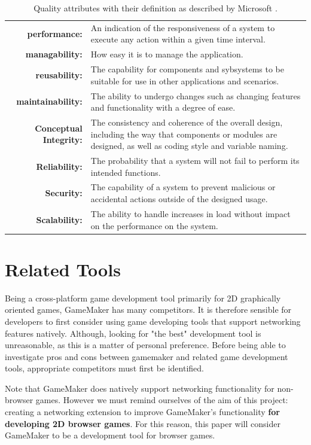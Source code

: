 \documentclass[bsc,frontabs,twoside,singlespacing,parskip,deptreport]{infthesis}     %
\begin{document}
\begin{table}[H]
\centering
  \begin{tabularx}{\textwidth}{r X}
	\textbf{performance:} & An indication of the responsiveness of a system to execute any action within a given time interval.\\
	\textbf{managability:} & How easy it is to manage the application.\\
	\textbf{reusability:} & The capability for components and sybsystems to be suitable for use in other applications and scenarios.\\
	\textbf{maintainability:} & The ability to undergo changes such as changing features and functionality with a degree of ease.\\
	\textbf{Conceptual Integrity:} & The consistency and coherence of the overall design, including the way that components or modules are designed, as well as coding style and variable naming.\\
	\textbf{Reliability:} & The probability that a system will not fail to perform its intended functions. \\
	\textbf{Security:} & The capability of a system to prevent malicious or accidental actions outside of the designed usage. \\
	\textbf{Scalability:} & The ability to handle increases in load without impact on the performance on the system. \\
  \end{tabularx}
  \caption{Quality attributes with their definition as described by Microsoft \cite{quality_attributes}.}
\label{table:quality_attributes}
\end{table}


\chapter{Related Tools}
Being a cross-platform game development tool primarily for 2D graphically oriented games, GameMaker has many competitors. It is therefore sensible for developers to first consider using game developing tools that support networking features natively. Although, looking for "the best" development tool is unreasonable, as this is a matter of personal preference. Before being able to investigate pros and cons between gamemaker and related game development tools, appropriate competitors must first be identified.

Note that GameMaker does natively support networking functionality for non-browser games. However we must remind ourselves of the aim of this project: creating a networking extension to improve GameMaker's functionality \textbf{for developing 2D browser games}. For this reason, this paper will consider GameMaker to be a development tool for browser games.
\end{document}
